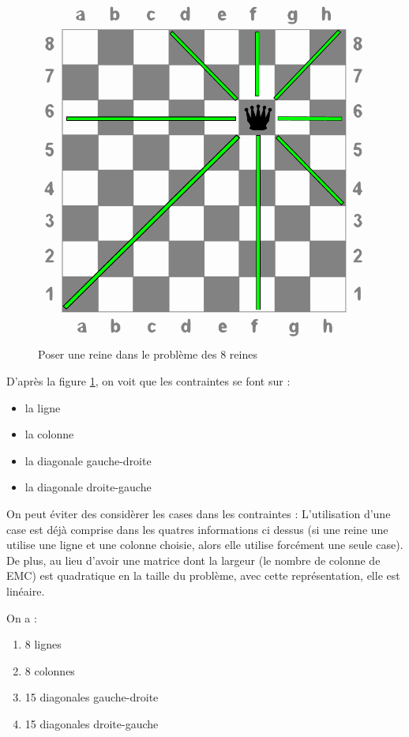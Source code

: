 \documentclass[a4paper]{article}
\begin{document}
\begin{figure}[h]
\begin{center}
\includegraphics[height=0.2\textheight]{../imports/8queens.pdf}
\caption{\label{8queens} Poser une reine dans le problème des 8 reines}
\end{center}
\end{figure}

D'après la figure \ref{8queens}, on voit que les contraintes se font sur : 
\begin{itemize}
\item la ligne
\item la colonne
\item la diagonale gauche-droite
\item la diagonale droite-gauche
\end{itemize}

On peut éviter des considèrer les cases dans les contraintes : L'utilisation
d'une case est déjà comprise dans les quatres informations ci dessus (si une
reine une utilise une ligne et une colonne choisie, alors elle utilise
forcément une seule case).
De plus, au lieu d'avoir une matrice dont la largeur 
(le nombre de colonne de EMC) est
quadratique en la taille du problème, avec cette représentation, elle est
linéaire.

On a : 
\begin{enumerate}
\item 8 lignes
\item 8 colonnes
\item 15 diagonales gauche-droite
\item 15 diagonales droite-gauche
\end{enumerate}
\end{document}
